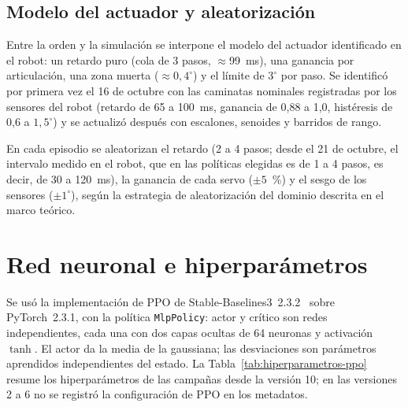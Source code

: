 \subsection{Modelo del actuador y aleatorización}

Entre la orden y la simulación se interpone el modelo del actuador
identificado en el robot: un retardo puro (cola de 3 pasos, $\approx$99~ms), una
ganancia por articulación, una zona muerta ($\approx0{,}4^\circ$) y el límite de
$3^\circ$ por paso. Se identificó por primera vez el 16 de octubre con las
caminatas nominales registradas por los sensores del robot (retardo de 65 a
100~ms, ganancia de 0,88 a 1,0, histéresis de 0,6 a $1{,}5^\circ$) y se
actualizó después con escalones, senoides y barridos de rango.

En cada episodio se aleatorizan el retardo (2 a 4 pasos; desde el 21 de
octubre, el intervalo medido en el robot, que en las políticas elegidas es de 1 a 4
pasos, es decir, de 30 a 120~ms), la ganancia de cada servo
($\pm5$~\%) y el sesgo de los sensores ($\pm1^\circ$), según la estrategia de
aleatorización del dominio descrita en el marco teórico.

\section{Red neuronal e hiperparámetros}

Se usó la implementación de PPO de Stable-Baselines3~2.3.2~\cite{raffin2021sb3}
sobre PyTorch~2.3.1, con la política \texttt{MlpPolicy}: actor y crítico son
redes independientes, cada una con dos capas ocultas de 64 neuronas y activación
$\tanh$. El actor da la media de la gaussiana; las desviaciones son parámetros
aprendidos independientes del estado. La Tabla~\ref{tab:hiperparametros-ppo}
resume los hiperparámetros de las campañas desde la versión 10; en las versiones
2 a 6 no se registró la configuración de PPO en los metadatos.

